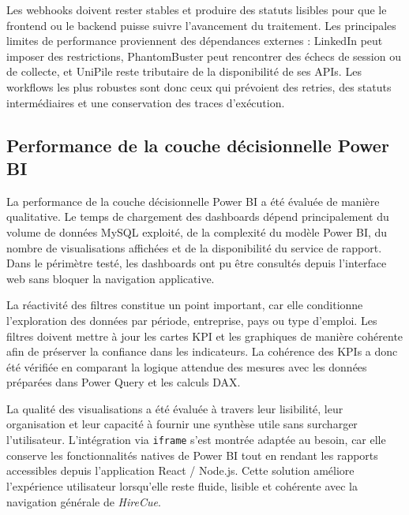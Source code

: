 Les webhooks doivent rester stables et produire des statuts lisibles pour que le frontend ou le backend puisse suivre l'avancement du traitement. Les principales limites de performance proviennent des dépendances externes : LinkedIn peut imposer des restrictions, PhantomBuster peut rencontrer des échecs de session ou de collecte, et UniPile reste tributaire de la disponibilité de ses APIs. Les workflows les plus robustes sont donc ceux qui prévoient des retries, des statuts intermédiaires et une conservation des traces d'exécution.

\subsection{Performance de la couche décisionnelle Power BI}

La performance de la couche décisionnelle Power BI a été évaluée de manière qualitative. Le temps de chargement des dashboards dépend principalement du volume de données MySQL exploité, de la complexité du modèle Power BI, du nombre de visualisations affichées et de la disponibilité du service de rapport. Dans le périmètre testé, les dashboards ont pu être consultés depuis l'interface web sans bloquer la navigation applicative.

La réactivité des filtres constitue un point important, car elle conditionne l'exploration des données par période, entreprise, pays ou type d'emploi. Les filtres doivent mettre à jour les cartes KPI et les graphiques de manière cohérente afin de préserver la confiance dans les indicateurs. La cohérence des KPIs a donc été vérifiée en comparant la logique attendue des mesures avec les données préparées dans Power Query et les calculs DAX.

La qualité des visualisations a été évaluée à travers leur lisibilité, leur organisation et leur capacité à fournir une synthèse utile sans surcharger l'utilisateur. L'intégration via \texttt{iframe} s'est montrée adaptée au besoin, car elle conserve les fonctionnalités natives de Power BI tout en rendant les rapports accessibles depuis l'application React / Node.js. Cette solution améliore l'expérience utilisateur lorsqu'elle reste fluide, lisible et cohérente avec la navigation générale de \textit{HireCue}.


